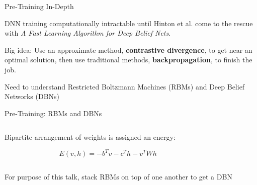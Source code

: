 \documentclass[notes]{beamer}
\begin{document}
\begin{frame}{Pre-Training In-Depth}
	\vfill

	\begin{center}
		DNN training computationally intractable until Hinton et al. come to the rescue with \textit{A Fast Learning Algorithm for Deep Belief Nets}.
	\end{center}
	
	\vfill

	\begin{center}
		Big idea: Use an approximate method, \textbf{contrastive divergence}, to get near an optimal solution, then use traditional methods, \textbf{backpropagation}, to finish the job. 
	\end{center}
	
	\vfill
	
	\begin{center}
		Need to understand Restricted Boltzmann Machines (RBMs) and Deep Belief Networks (DBNs)
	\end{center}
	
	\vfill
\end{frame}

\begin{frame}{Pre-Training: RBMs and DBNs}
	\vfill

	\begin{columns}
		\begin{column}{0.4\linewidth}
			\begin{center}
				Bipartite arrangement of weights is assigned an energy:
			\end{center}
		
			\begin{equation*}	
				E(v, h) = - b^T v - c^T h - v^T W h
			\end{equation*}
		\end{column}
		\begin{column}{0.6\linewidth}
		\end{column}
	\end{columns}
	
	\vfill

	\begin{center}
		For purpose of this talk, stack RBMs on top of one another to get a DBN
	\end{center}

	\vfill
\end{frame}
\end{document}
